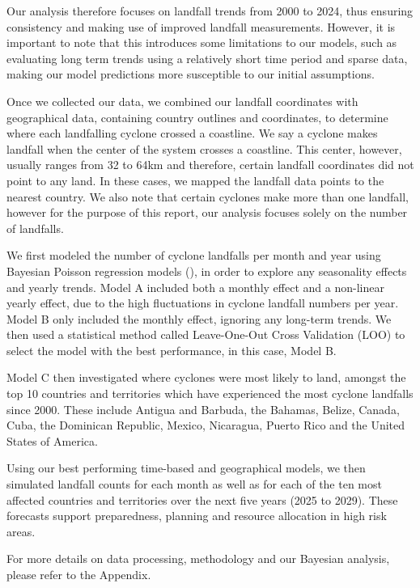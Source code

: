 \documentclass[
]{article}
\begin{document}
Our analysis therefore focuses on landfall trends from 2000 to 2024, thus ensuring consistency and making use of improved landfall measurements. However, it is important to note that this introduces some limitations to our models, such as evaluating long term trends using a relatively short time period and sparse data, making our model predictions more susceptible to our initial assumptions.

Once we collected our data, we combined our landfall coordinates with geographical data, containing country outlines and coordinates, to determine where each landfalling cyclone crossed a coastline. We say a cyclone makes landfall when the center of the system crosses a coastline. This center, however, usually ranges from 32 to 64km and therefore, certain landfall coordinates did not point to any land. In these cases, we mapped the landfall data points to the nearest country. We also note that certain cyclones make more than one landfall, however for the purpose of this report, our analysis focuses solely on the number of landfalls.

We first modeled the number of cyclone landfalls per month and year using Bayesian Poisson regression models (), in order to explore any seasonality effects and yearly trends. Model A included both a monthly effect and a non-linear yearly effect, due to the high fluctuations in cyclone landfall numbers per year. Model B only included the monthly effect, ignoring any long-term trends. We then used a statistical method called Leave-One-Out Cross Validation (LOO) to select the model with the best performance, in this case, Model B.

Model C then investigated where cyclones were most likely to land, amongst the top 10 countries and territories which have experienced the most cyclone landfalls since 2000. These include Antigua and Barbuda, the Bahamas, Belize, Canada, Cuba, the Dominican Republic, Mexico, Nicaragua, Puerto Rico and the United States of America.

Using our best performing time-based and geographical models, we then simulated landfall counts for each month as well as for each of the ten most affected countries and territories over the next five years (2025 to 2029). These forecasts support preparedness, planning and resource allocation in high risk areas.

For more details on data processing, methodology and our Bayesian analysis, please refer to the Appendix.
\end{document}

